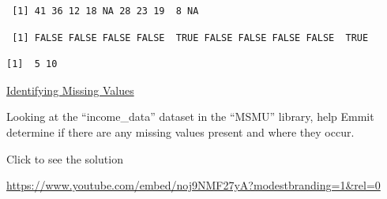 \documentclass[
  letterpaper,
  DIV=11,
  numbers=noendperiod]{scrreprt}
\newenvironment{Shaded}{\begin{snugshade}}{\end{snugshade}}
\newcommand{\DecValTok}[1]{\textcolor[rgb]{0.68,0.00,0.00}{#1}}
\newcommand{\FunctionTok}[1]{\textcolor[rgb]{0.28,0.35,0.67}{#1}}
\newcommand{\NormalTok}[1]{\textcolor[rgb]{0.00,0.23,0.31}{#1}}
\newcommand{\SpecialCharTok}[1]{\textcolor[rgb]{0.37,0.37,0.37}{#1}}
\begin{document}
\begin{verbatim}
 [1] 41 36 12 18 NA 28 23 19  8 NA
\end{verbatim}

\begin{Shaded}
\end{Shaded}

\begin{verbatim}
 [1] FALSE FALSE FALSE FALSE  TRUE FALSE FALSE FALSE FALSE  TRUE
\end{verbatim}

\begin{Shaded}
\end{Shaded}

\begin{verbatim}
[1]  5 10
\end{verbatim}

\begin{watch}{}{}
    \href{https://youtu.be/Gj_-ZS9wH6c}{Identifying Missing Values}
\end{watch}

\begin{tcolorbox}[enhanced jigsaw, leftrule=.75mm, arc=.35mm, coltitle=black, rightrule=.15mm, bottomrule=.15mm, toprule=.15mm, left=2mm, colbacktitle=quarto-callout-tip-color!10!white, title=\textcolor{quarto-callout-tip-color}{\faLightbulb}\hspace{0.5em}{Try it Out}, toptitle=1mm, breakable, colframe=quarto-callout-tip-color-frame, bottomtitle=1mm, titlerule=0mm, colback=white, opacityback=0, opacitybacktitle=0.6]

Looking at the ``income\_data'' dataset in the ``MSMU'' library, help
Emmit determine if there are any missing values present and where they
occur.

Click to see the solution

\url{https://www.youtube.com/embed/noj9NMF27yA?modestbranding=1&rel=0}

\end{tcolorbox}
\end{document}
